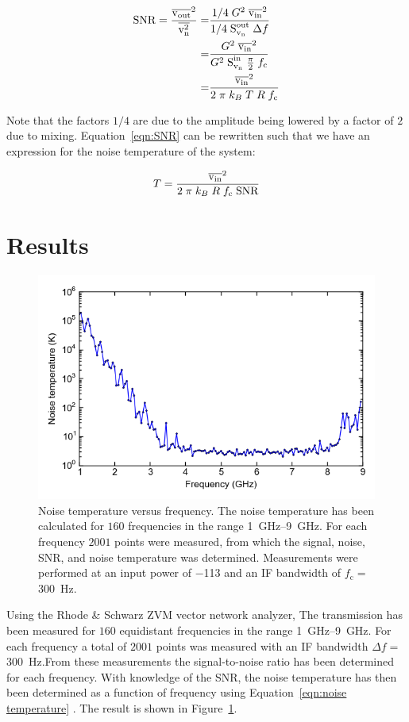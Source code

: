 \documentclass[12pt]{report}
\begin{document}
\begin{align}
    \text{SNR} = \frac{\overline{\text{v}_\text{out}}^2}{\overline{\text{v}_\text{n}^2}} = & \frac{1/4 \;G^2 \; \overline{\text{v}_\text{in}}^2}{1/4 \; \text{S}_{\text{v}_\text{n}}^\text{out} \; \Delta f}\notag\\
        = & \frac{G^2 \; \overline{\text{v}_\text{in}}^2}{G^2 \; \text{S}_{\text{v}_\text{n}}^\text{in} \;\frac{\pi}{2}\;f_\text{c}}\notag\\
        = & \frac{\overline{\text{v}_\text{in}}^2}{2\;\pi \; k_B \; T \; R \; f_\text{c}}
    \label{eqn:SNR}
\end{align}

Note that the factors $1/4$ are due to the amplitude being lowered by a factor of $2$ due to mixing. Equation~\ref{eqn:SNR} can be rewritten such that we have an expression for the noise temperature of the system:

\begin{equation}
    T =\frac{\overline{\text{v}_\text{in}}^2}{2\; \pi \; k_B \; R \; f_\text{c} \; \text{SNR}}
    \label{eqn:noise temperature}
\end{equation}


\section{Results}
\label{sec:noise_results}
\begin{figure}[h]
    \centering
    \includegraphics[width = .7 \linewidth]{Figures/noise_temperature_versus_power.png}
    \caption{Noise temperature versus frequency. The noise temperature has been calculated for $160$ frequencies in the range \SIrange{1}{9}{\giga \hertz}. For each frequency $2001$ points were measured, from which the signal, noise, SNR, and noise temperature was determined. Measurements were performed at an input power of \SI{-113}{\dBm} and an IF bandwidth of $f_\text{c} = $\SI{300}{\hertz}.}
    \label{fig:Noise temperature}
\end{figure}

Using the Rhode \& Schwarz ZVM vector network analyzer, The transmission has been measured for $160$ equidistant frequencies in the range \SIrange{1}{9}{\giga \hertz}. For each frequency a total of $2001$ points was measured with an IF bandwidth $\Delta f = $ \SI{300}{\hertz}.From these measurements the signal-to-noise ratio has been determined for each frequency. With knowledge of the SNR, the noise temperature has then been determined as a function of frequency using Equation~\ref{eqn:noise temperature} . The result is shown in Figure~\ref{fig:Noise temperature}.
\end{document}
